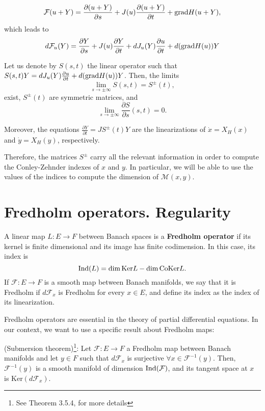 \[\mathcal{F}(u+Y) = \frac{\partial (u + Y)}{\partial s} + J(u) \frac{\partial (u + Y)}{\partial t}  + \mathrm{grad} H(u + Y) ,\]
which leads to
\[d\mathcal{F}_u(Y) = \frac{\partial Y}{\partial s} + J(u) \frac{\partial Y}{\partial t} + dJ_u(Y) \frac{\partial u}{\partial t} + d(\mathrm{grad} H(u)) Y\]

\begin{prop}
Let us denote by $S(s,t)$ the linear operator such that $S(s,t)Y = dJ_u(Y) \frac{\partial u}{\partial t} + d(\mathrm{grad} H(u))Y$. Then, the limits
\[\lim_{s \rightarrow \pm \infty} S(s,t) = S^{\pm}(t) ,\]
exist, $S^{\pm}(t)$ are symmetric matrices, and
\[\lim_{s \rightarrow \pm \infty} \frac{\partial S}{\partial s} (s,t) = 0 .\]

Moreover, the equations $\frac{\partial Y}{\partial t} = J S^{\pm}(t)Y$ are the linearizations of $\dot{x} = X_H(x)$ and $\dot{y} = X_H(y)$, respectively.
\end{prop}

Therefore, the matrices $S^{\pm}$ carry all the relevant information in order to compute the Conley-Zehnder indexes of $x$ and $y$. In particular, we will be able to use the values of the indices to compute the dimension of $\mathcal{M}(x,y)$.

\section{Fredholm operators. Regularity}

\begin{deff}
A linear map $L : E \rightarrow F$ between Banach spaces is a {\bf Fredholm operator} if its kernel is finite dimensional and its image has finite codimension. In this case, its index is
\[\mathrm{Ind}(L) = \dim \mathrm{Ker} L - \dim \mathrm{CoKer} L .\]
If $\mathcal{F} : E \rightarrow F$ is a smooth map between Banach manifolds, we say that it is Fredholm if $d\mathcal{F}_x$ is Fredholm for every $x \in E$, and define its index as the index of its linearization.
\end{deff}

Fredholm operators are essential in the theory of partial differential equations. In our context, we want to use a specific result about Fredholm maps:

\begin{theo} \label{theo:local_surjection} (Submersion theorem)\footnote{See \cite{abraham2012manifolds} Theorem 3.5.4, for more details}: Let $\mathcal{F} : E \rightarrow F$ a Fredholm map between Banach manifolds and let $y \in F$ such that $d\mathcal{F}_x$ is surjective $\forall x \in \mathcal{F}^{-1}(y)$. Then, $\mathcal{F}^{-1}(y)$ is a smooth manifold of dimension $\mathrm{Ind}(\mathcal{F})$, and its tangent space at $x$ is $\mathrm{Ker}(d\mathcal{F}_x)$.
\end{theo}

